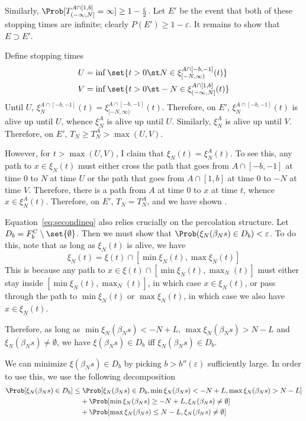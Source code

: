 \documentclass{scrartcl}
\newcommand{\ep}{\varepsilon}
\begin{document}
Similarly, $\Prob[T_{(-\infty,N]}^{A \cap [1,b]} = \infty] \geq 1 - \frac{\ep}{2}$. Let $E'$ be the event that both of these stopping times are infinite; clearly $P(E') \geq 1 - \ep$. It remains to show that $E \supset E'$.

Define stopping times
\begin{align*}
  U &= \inf\set{t > 0 \st N \in \xi_{[-N,\infty)}^{A \cap [-b,-1]}(t)} \\
  V &= \inf\set{t > 0 \st -N \in \xi_{(-\infty,N]}^{A \cap [1,b]}(t)}
\end{align*}
Until $U$, $\xi_{N}^{A \cap [-b,-1]}(t) = \xi_{[-N,\infty)}^{A \cap [-b,-1]}(t)$. Therefore, on $E'$, $\xi_{N}^{A \cap [-b,-1]}(t)$ is alive up until $U$, whence $\xi_{N}^{A}$ is alive up until $U$. Similarly, $\xi_{N}^{A}$ is alive up until $V$. Therefore, on $E'$, $T_{N} \geq T_{N}^{A} > \max(U,V)$.

However, for $t > \max(U,V)$, I claim that $\xi_{N}(t) = \xi_{N}^{A}(t)$. To see this, any path to $x \in \xi_{N}(t)$ must either cross the path that goes from $A \cap [-b,-1]$ at time $0$ to $N$ at time $U$ or the path that goes from $A \cap [1,b]$ at time $0$ to $-N$ at time $V$. Therefore, there is a path from $A$ at time $0$ to $x$ at time $t$, whence $x \in \xi_{N}^{A}(t)$. Therefore, on $E'$, $T_{N} = T_{N}^{A}$, and we have shown .

Equation~\ref{eq:secondineq} also relies crucially on the percolation structure. Let $D_{b} = F_{b}^{C} \setminus \set{\emptyset}$. Then we must show that $\Prob(\xi_{N}(\beta_{N}s) \in D_{b}) < \ep$. To do this, note that as long as $\xi_{N}(t)$ is alive, we have
\[ \xi_{N}(t) = \xi(t) \cap [\min \xi_{N}(t), \max \xi_{N}(t)] \]
This is because any path to $x \in \xi(t) \cap [\min \xi_{N}(t), \max_{N}(t)]$ must either stay inside $[\min \xi_{N}(t), \max_{N}(t)]$, in which case $x \in \xi_{N}(t)$, or pass through the path to $\min \xi_{N}(t)$ or $\max \xi_{N}(t)$, in which case we also have $x \in \xi_{N}(t)$.

Therefore, as long as $\min \xi_{N}(\beta_{N}s) < -N + L$, $\max \xi_{N}(\beta_{N}s) > N - L$ and $\xi_{N}(\beta_{N}s) \neq \emptyset$, we have $\xi(\beta_{N}s) \in D_{b}$ iff $\xi_{N}(\beta_{N}s) \in D_{b}$.

We can minimize $\xi(\beta_{N}s) \in D_{b}$ by picking $b > b''(\ep)$ sufficiently large. In order to use this, we use the following decomposition
\begin{align*}
  \Prob[\xi_{N}(\beta_{N}s) \in D_{b}] \leq&\; \Prob[\xi_{N}(\beta_{N}s) \in D_{b}, \min \xi_{N}(\beta_{N}s) < -N + L, \max \xi_{N}(\beta_{N}s) > N - L] \\
                                &+ \Prob[\min \xi_{N}(\beta_{N}s) \geq -N + L, \xi_{N}(\beta_{N}s) \neq \emptyset] \\
                                &+ \Prob[\max \xi_{N}(\beta_{N}s) \leq N - L, \xi_{N}(\beta_{N}s) \neq \emptyset]
\end{align*}
\end{document}
